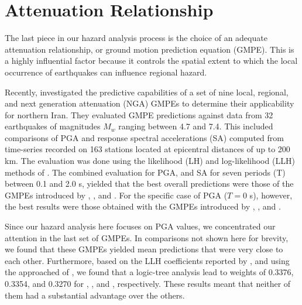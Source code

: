 
\section{Attenuation Relationship}

The last piece in our hazard analysis process is the choice of an adequate attenuation relationship, or ground motion prediction equation (GMPE). This is a highly influential factor because it controls the spatial extent to which the local occurrence of earthquakes can influence regional hazard. 

Recently, \citet{Zafarani2014} investigated the predictive capabilities of a set of nine local, regional, and next generation attenuation (NGA) GMPEs to determine their applicability for northern Iran. They evaluated GMPE predictions against data from 32 earthquakes of magnitudes $M_w$ ranging between 4.7 and 7.4. This included comparisons of PGA and response spectral accelerations (SA) computed from time-series recorded on 163 stations located at epicentral distances of up to 200 km. The evaluation was done using the likelihood (LH) and log-likelihood (LLH) methods of \citet{Scherbaum_2004_BSSA, Scherbaum_2009_BSSA}. The combined evaluation for PGA, and SA for seven periods (T) between 0.1 and 2.0 s, yielded that the best overall predictions were those of the GMPEs introduced by \citet{Ghasemi_2009_JS}, \citet{Abrahamson_2008_ES}, and \citet{Chiou2008}. For the specific case of PGA ($T=0$ s), however, the best results were those obtained with the GMPEs introduced by \citet{Kalkan2004}, \citet{Chiou2008}, and \citet{Boore2008}.

Since our hazard analysis here focuses on PGA values, we concentrated our attention in the last set of GMPEs. In comparisons not shown here for brevity, we found that these GMPEs yielded mean predictions that were very close to each other. Furthermore, based on the LLH coefficients reported by \citet{Zafarani2014}, and using the approached of \citet{Scherbaum_2009_BSSA}, we found that a logic-tree analysis lead to weights of 0.3376, 0.3354, and 0.3270 for \citet{Kalkan2004}, \citet{Chiou2008}, and \citet{Boore2008}, respectively. These results meant that neither of them had a substantial advantage over the others. 

